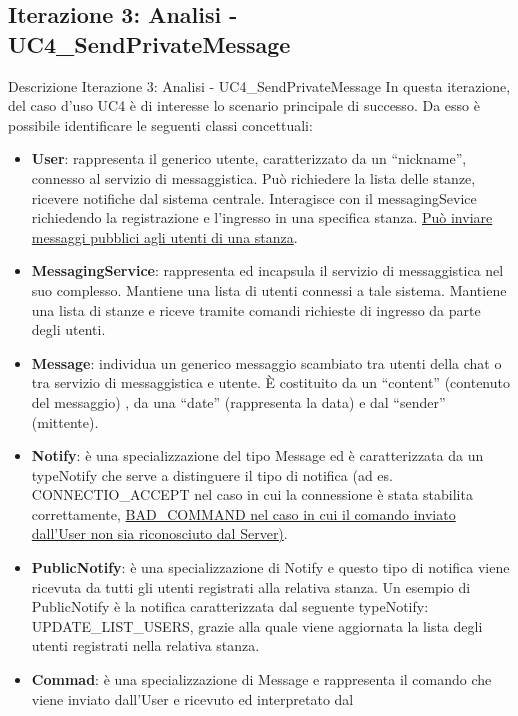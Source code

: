 \documentclass[t]{beamer} %
\let\olditem=\item%
\renewcommand{\item}{\olditem \justifying}%
\begin{document}
\subsection {Iterazione 3: Analisi - UC4\_SendPrivateMessage}
\begin{frame} [allowframebreaks] {Descrizione Iterazione 3: Analisi - UC4\_SendPrivateMessage}
  In questa iterazione, del caso d’uso UC4 è di interesse lo scenario principale di successo.  Da esso è possibile identificare le seguenti classi concettuali: 
  \begin{itemize}
   \item \textbf{User}: rappresenta il generico utente, caratterizzato da un ``nickname'', connesso al servizio di messaggistica. Può richiedere la lista delle 
         stanze, ricevere notifiche dal sistema centrale. Interagisce con il messagingSevice richiedendo la registrazione e l’ingresso in una specifica stanza. 
         \underline{Può inviare messaggi pubblici agli utenti di una stanza}.
   \item \textbf{MessagingService}: rappresenta ed incapsula il servizio di messaggistica nel suo complesso. Mantiene una lista di utenti connessi a tale sistema. 
         Mantiene una lista di stanze e riceve tramite comandi richieste di ingresso da parte degli utenti.
   \item \textbf{Message}: individua un generico messaggio scambiato tra utenti della chat o tra servizio di messaggistica e utente. È costituito da un 
         ``content'' (contenuto del messaggio) , da una ``date'' (rappresenta la data) e dal ``sender'' (mittente).
   \item \textbf{Notify}: è una specializzazione del tipo Message ed è caratterizzata da un typeNotify che serve a distinguere il tipo di notifica (ad es. 
          CONNECTIO\_ACCEPT nel caso in cui la connessione è stata stabilita correttamente, \underline{BAD\_COMMAND nel caso in cui il comando inviato dall'User non 
          sia riconosciuto dal Server)}.
   \item \textbf{PublicNotify}: è una specializzazione di Notify e questo tipo di notifica viene ricevuta da tutti gli utenti registrati alla relativa 
          stanza. Un esempio di PublicNotify è la notifica caratterizzata dal seguente typeNotify: UPDATE\_LIST\_USERS, grazie alla quale viene 
          aggiornata la lista degli utenti registrati nella relativa stanza.
   \item  \textbf{Commad}: è una specializzazione di Message e rappresenta il comando che viene inviato dall'User e ricevuto ed interpretato dal            

\end{itemize}
\end{frame}
\end{document}
